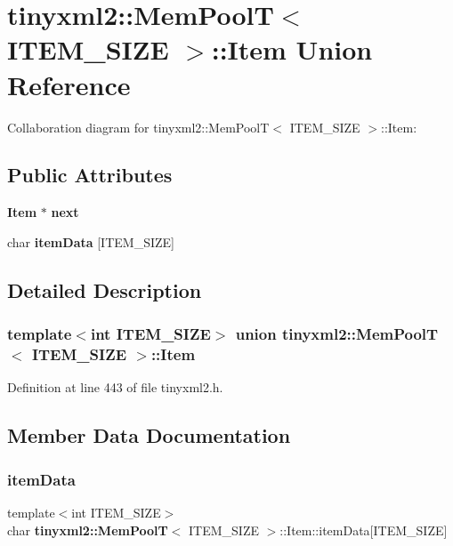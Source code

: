 \section{tinyxml2\+:\+:Mem\+PoolT$<$ I\+T\+E\+M\+\_\+\+S\+I\+ZE $>$\+:\+:Item Union Reference}
\label{uniontinyxml2_1_1_mem_pool_t_1_1_item}


Collaboration diagram for tinyxml2\+:\+:Mem\+PoolT$<$ I\+T\+E\+M\+\_\+\+S\+I\+ZE $>$\+:\+:Item\+:
\subsection*{Public Attributes}
\begin{DoxyCompactItemize}
\item 
\textbf{ Item} $\ast$ \textbf{ next}
\item 
char \textbf{ item\+Data} [I\+T\+E\+M\+\_\+\+S\+I\+ZE]
\end{DoxyCompactItemize}


\subsection{Detailed Description}
\subsubsection*{template$<$int I\+T\+E\+M\+\_\+\+S\+I\+ZE$>$\newline
union tinyxml2\+::\+Mem\+Pool\+T$<$ I\+T\+E\+M\+\_\+\+S\+I\+Z\+E $>$\+::\+Item}



Definition at line 443 of file tinyxml2.\+h.



\subsection{Member Data Documentation}
\mbox{\label{uniontinyxml2_1_1_mem_pool_t_1_1_item_aff63ccc8d7b05035820b83e1f0fa8037}} 
\subsubsection{item\+Data}
{\footnotesize\ttfamily template$<$int I\+T\+E\+M\+\_\+\+S\+I\+ZE$>$ \\
char \textbf{ tinyxml2\+::\+Mem\+PoolT}$<$ I\+T\+E\+M\+\_\+\+S\+I\+ZE $>$\+::Item\+::item\+Data[I\+T\+E\+M\+\_\+\+S\+I\+ZE]}



